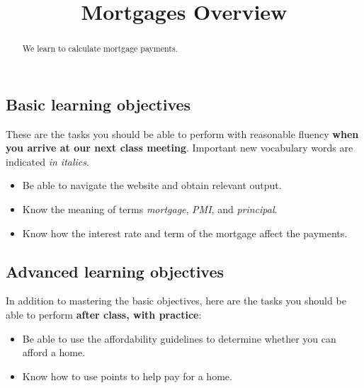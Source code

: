 \documentclass{ximera}
\title{Mortgages Overview}
\begin{document}
\begin{abstract}
We learn to calculate mortgage payments.
\end{abstract}
\maketitle

\subsection*{Basic learning objectives}

These are the tasks you should be able to perform with reasonable fluency \textbf{when you arrive at our next class meeting}. Important new vocabulary words are indicated \emph{in italics}. 

\begin{itemize}
	\item Be able to navigate the website  and obtain relevant output.
    \item Know the meaning of terms \emph{mortgage}, \emph{PMI}, and \emph{principal}. 
    \item Know how the interest rate and term of the mortgage affect the payments.
\end{itemize}

\subsection*{Advanced learning objectives}

In addition to mastering the basic objectives, here are the tasks you should be able to perform \textbf{after class, with practice}: 

\begin{itemize}
	\item Be able to use the affordability guidelines to determine whether you can afford a home.
    \item Know how to use points to help pay for a home.
\end{itemize}
\end{document}
